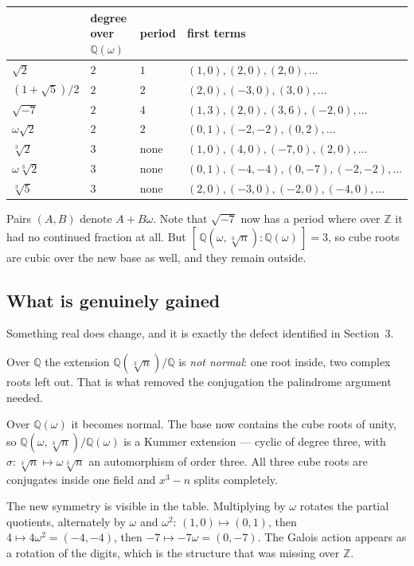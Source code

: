 \documentclass[12pt,a4paper]{article}
\theoremstyle{plain}
\theoremstyle{definition}
\begin{document}
\begin{center}
\begin{tabular}{llll}
\toprule
 & degree over $\mathbb{Q}(\omega)$ & period & first terms \\
\midrule
$\sqrt2$          & $2$ & $1$    & $(1,0),(2,0),(2,0),\ldots$ \\
$(1+\sqrt5)/2$    & $2$ & $2$    & $(2,0),(-3,0),(3,0),\ldots$ \\
$\sqrt{-7}$       & $2$ & $4$    & $(1,3),(2,0),(3,6),(-2,0),\ldots$ \\
$\omega\sqrt2$    & $2$ & $2$    & $(0,1),(-2,-2),(0,2),\ldots$ \\
$\sqrt[3]{2}$     & $3$ & none   & $(1,0),(4,0),(-7,0),(2,0),\ldots$ \\
$\omega\sqrt[3]{2}$ & $3$ & none & $(0,1),(-4,-4),(0,-7),(-2,-2),\ldots$ \\
$\sqrt[3]{5}$     & $3$ & none   & $(2,0),(-3,0),(-2,0),(-4,0),\ldots$ \\
\bottomrule
\end{tabular}
\end{center}

Pairs $(A,B)$ denote $A + B\omega$. Note that $\sqrt{-7}$ now has a period where over $\mathbb{Z}$ it had no continued fraction at all. But $[\,\mathbb{Q}(\omega,\sqrt[3]{n}):\mathbb{Q}(\omega)\,] = 3$, so cube roots are cubic over the new base as well, and they remain outside.

\subsection*{What is genuinely gained}

Something real does change, and it is exactly the defect identified in Section~3.

Over $\mathbb{Q}$ the extension $\mathbb{Q}(\sqrt[3]{n})/\mathbb{Q}$ is \emph{not normal}: one root inside, two complex roots left out. That is what removed the conjugation the palindrome argument needed.

Over $\mathbb{Q}(\omega)$ it becomes normal. The base now contains the cube roots of unity, so $\mathbb{Q}(\omega,\sqrt[3]{n})/\mathbb{Q}(\omega)$ is a Kummer extension --- cyclic of degree three, with $\sigma : \sqrt[3]{n}\mapsto\omega\sqrt[3]{n}$ an automorphism of order three. All three cube roots are conjugates inside one field and $x^3-n$ splits completely.

The new symmetry is visible in the table. Multiplying by $\omega$ rotates the partial quotients, alternately by $\omega$ and $\omega^2$: $(1,0)\mapsto(0,1)$, then $4 \mapsto 4\omega^2 = (-4,-4)$, then $-7\mapsto-7\omega = (0,-7)$. The Galois action appears as a rotation of the digits, which is the structure that was missing over $\mathbb{Z}$.
\end{document}
